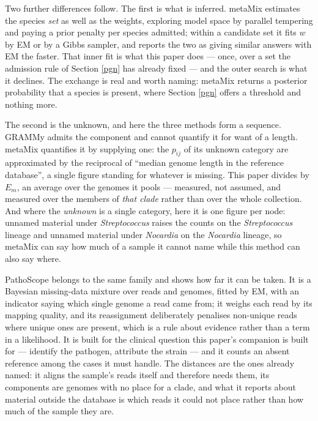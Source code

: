 \documentclass[pdflatex,sn-vancouver-num]{sn-jnl}
\begin{document}
    Two further differences follow. The first is what is inferred. metaMix estimates the species
    \emph{set} as well as the weights, exploring model space by parallel tempering and paying a prior
    penalty per species admitted; within a candidate set it fits $w$ by EM or by a Gibbs sampler, and
    reports the two as giving similar answers with EM the faster. That inner fit is what this paper
    does --- once, over a set the admission rule of Section \ref{pgn} has already fixed --- and the
    outer search is what it declines. The exchange is real and worth naming: metaMix returns a
    posterior probability that a species is present, where Section \ref{pgn} offers a threshold and
    nothing more.

    The second is the unknown, and here the three methods form a sequence. GRAMMy admits the
    component and cannot quantify it for want of a length. metaMix quantifies it by supplying one:
    the $p_{ij}$ of its unknown category are approximated by the reciprocal of \enquote{median genome
    length in the reference database}, a single figure standing for whatever is missing. This paper
    divides by $E_m$, an average over the genomes it pools --- measured, not assumed, and measured over the
    members of \emph{that clade} rather than over the whole collection. And where the \emph{unknown}
    is a single category, here it is one figure per node: unnamed material under
    \emph{Streptococcus} raises the counts on the \emph{Streptococcus} lineage and unnamed material
    under \emph{Nocardia} on the \emph{Nocardia} lineage, so metaMix can say how much of a sample it
    cannot name while this method can also say where.

    PathoScope \citep{pathoscope} belongs to the same family and shows how far it can be taken.
    It is a Bayesian missing-data mixture over reads and genomes, fitted by EM, with an indicator
    saying which single genome a read came from; it weighs each read by its mapping quality, and its
    reassignment deliberately penalises non-unique reads where unique ones are present, which is a
    rule about evidence rather than a term in a likelihood. It is built for the clinical question
    this paper's companion is built for --- identify the pathogen, attribute the strain --- and it
    counts an absent reference among the cases it must handle. The distances are the ones already
    named: it aligns the sample's reads itself and therefore needs them, its components are genomes
    with no place for a clade, and what it reports about material outside the database is which reads
    it could not place rather than how much of the sample they are.
\end{document}
